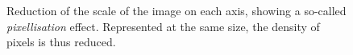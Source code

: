 \begin{figure}[H]
 \centering\caption{Reduction of the scale of the image on each axis, showing a so-called \textit{pixellisation} effect. Represented at the same size, the density of pixels is thus reduced.}%
 \hfill
 \hfill
 \label{fig:introduction:python:resizing}
\end{figure}

\vspace*{-7mm}

